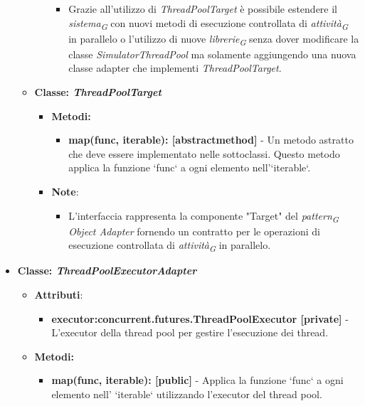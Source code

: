 \begin{itemize}
\begin{itemize}
\begin{itemize}
\begin{itemize}
            \item Grazie all'utilizzo di \textit{ThreadPoolTarget} è possibile estendere il \textit{sistema}\textsubscript{\textit{G}} con nuovi metodi di esecuzione controllata di \textit{attività}\textsubscript{\textit{G}} in parallelo o l'utilizzo di nuove \textit{librerie}\textsubscript{\textit{G}} senza dover modificare la classe \textit{SimulatorThreadPool} ma solamente aggiungendo una nuova classe adapter che implementi \textit{ThreadPoolTarget}.
        \end{itemize}
    \end{itemize}
    \item{\textbf{Classe: \textit{ThreadPoolTarget}}}
    \begin{itemize}
    \item\textbf{Metodi: }
    \begin{itemize}
        \item \textbf{map(func, iterable): [abstractmethod]} - Un metodo astratto che deve essere implementato nelle sottoclassi. Questo metodo applica la funzione `func` a ogni elemento nell'`iterable`.
    \end{itemize}
    \item\textbf{Note}:
        \begin{itemize}
            \item L'interfaccia rappresenta la componente "Target" del \textit{pattern}\textsubscript{\textit{G}} \textit{Object Adapter} fornendo un contratto per le operazioni di esecuzione controllata di \textit{attività}\textsubscript{\textit{G}} in parallelo.
         \end{itemize}
    \end{itemize}
    \end{itemize}
    \item{\textbf{Classe: \textit{ThreadPoolExecutorAdapter}}}
    \begin{itemize}
    \item\textbf{Attributi}:
        \begin{itemize}
        \item \textbf{executor:concurrent.futures.ThreadPoolExecutor [private]} - L'executor della thread pool per gestire l'esecuzione dei thread.
    \end{itemize}
    \item \textbf{Metodi: }
    \begin{itemize}
        \item \textbf{map(func, iterable): [public]} - Applica la funzione `func` a ogni elemento nell' `iterable` utilizzando l'executor del thread pool.

\end{itemize}
\end{itemize}
\end{itemize}
